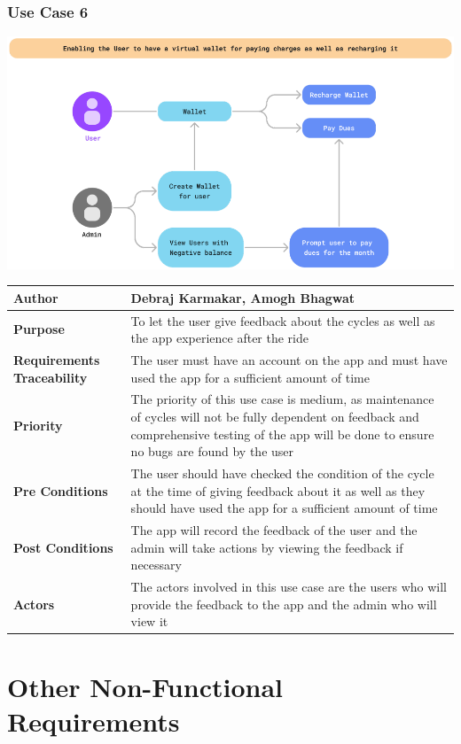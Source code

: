 \documentclass[11pt]{article}
\begin{document}
\subsubsection{Use Case 6}
\begin{center}
\includegraphics*[scale=0.5]{usecase-6.png}
\begin{tabular}{|l|p{10cm}|}
    \hline
    \textbf{Author} & Debraj Karmakar, Amogh Bhagwat\\
    \hline
    \textbf{Purpose} & To let the user give feedback about the cycles as well as the app experience after the ride \\
    \hline
    \textbf{Requirements Traceability} & The user must have an account on the app and must have used the app for a sufficient amount of time\\
    \hline
    \textbf{Priority} & The priority of this use case is medium, as maintenance of cycles will not be fully dependent on feedback and comprehensive testing of the app will be done to ensure no bugs are found by the user\\
    \hline
    \textbf{Pre Conditions} & The user should have checked the condition of the cycle at the time of giving feedback about it as well as they should have used the app for a sufficient amount of time\\
    \hline
    \textbf{Post Conditions} & The app will record the feedback of the user and the admin will take actions by viewing the feedback if necessary\\
    \hline
    \textbf{Actors} & The actors involved in this use case are the users who will provide the feedback to the app and the admin who will view it\\
    \hline
\end{tabular}
\end{center}

\newpage
\section{Other Non-Functional Requirements}
\end{document}

